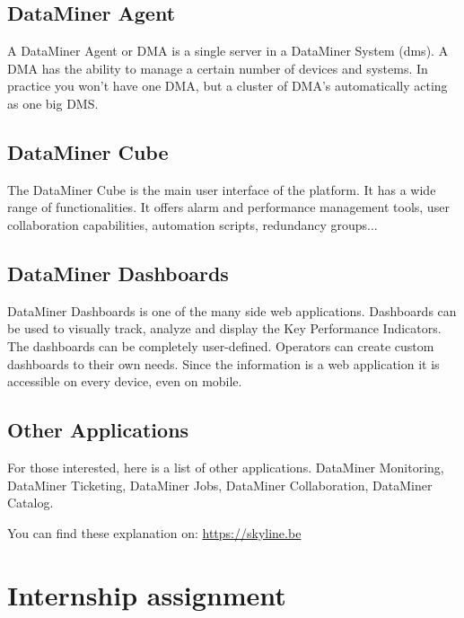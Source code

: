 \subsection{DataMiner Agent}
A DataMiner Agent or DMA is a single server in a DataMiner System (\gls{dms}). A DMA has the ability to manage a certain number of devices and systems. In practice you won't have one DMA, but a cluster of DMA's automatically acting as one big DMS.

\subsection{DataMiner Cube}
The DataMiner Cube is the main user interface of the \dm platform. It has a wide range of functionalities. It offers alarm and performance management tools, user collaboration capabilities, automation scripts, redundancy groups...

\subsection{DataMiner Dashboards}
 DataMiner Dashboards is one of the many side web applications. Dashboards can be used to visually track, analyze and display the Key Performance Indicators. The dashboards can be completely user-defined. Operators can create custom dashboards to their own needs. Since the information is a web application it is accessible on every device, even on mobile.
 
\subsection{Other Applications}
For those interested, here is a list of other applications. DataMiner Monitoring, DataMiner Ticketing, DataMiner Jobs, DataMiner Collaboration, DataMiner Catalog. 


You can find these explanation on: \url{https://skyline.be}

\section{Internship assignment}




